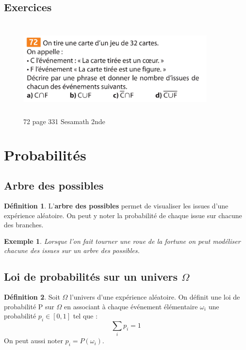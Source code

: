 \documentclass[a4paper,12pt,final]{article}
\newtheorem{Ex}{Exemple}[section]
\theoremstyle{theorem}
\theoremstyle{definition}
\theoremstyle{definition}
\theoremstyle{definition}
\newtheorem{Def}{Définition}[section]
\begin{document}
		\subsection{Exercices}
			
\begin{figure}[h!]
	\centering
	\includegraphics[width=10cm,height=5cm]{Sesamath2de_72p331.pdf}
	\caption{72 page 331 Sesamath 2nde}
	\label{fig:sesamath2de72p331}
\end{figure}
	
\section{Probabilités}
	\subsection{Arbre des possibles}
		\begin{Def}
			L'\textbf{arbre des possibles} permet de visualiser les issues d'une expérience aléatoire. On peut y noter la probabilité de chaque issue sur chacune des branches.
		\end{Def}
	
		\begin{Ex}
			Lorsque l'on fait tourner une roue de la fortune on peut modéliser chacune des issues sur un arbre des possibles.
		\end{Ex}
	\subsection{Loi de probabilités sur un univers $\Omega$}
	
		\begin{Def}
			Soit $\Omega$ l'univers d'une expérience aléatoire. On définit une loi de probabilité P sur $\Omega$ en associant à chaque événement élémentaire $\omega_{i}$ une probabilité $p_{i} \in [0,1]$ tel que :
			\[\sum_{i}p_{i} = 1\]
			On peut aussi noter $p_{i} = P(\omega_{i})$.
		\end{Def}
		
\end{document}
